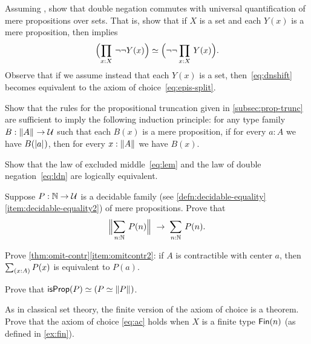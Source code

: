 \begin{ex}\label{ex:lem-impl-dn-commutes}
  Assuming \LEM{}, show that double negation commutes with universal quantification of mere propositions over sets.
  That is, show that if $X$ is a set and each $Y(x)$ is a mere proposition, then \LEM{} implies
  \begin{equation}
    \eqv{\Parens{\prd{x:X} \neg\neg Y(x)}}{\Parens{\neg\neg \prd{x:X} Y(x)}}.\label{eq:dnshift}
  \end{equation}
  Observe that if we assume instead that each $Y(x)$ is a set, then~\eqref{eq:dnshift} becomes equivalent to the axiom of choice~\eqref{eq:epis-split}.
\end{ex}

\begin{ex}\label{ex:prop-trunc-ind}
  Show that the rules for the propositional truncation given in \cref{subsec:prop-trunc} are sufficient to imply the following induction principle: for any type family $B:\mathopen{}\left\Vert A\right\Vert_{}\mathclose{} \to \mathcal{U}$ such that each $B(x)$ is a mere proposition, if for every $a:A$ we have $B(\mathopen{}\left|a\right|_{}^{}\mathclose{})$, then for every $x:\mathopen{}\left\Vert A\right\Vert_{}\mathclose{}$ we have $B(x)$.
\end{ex}

\begin{ex}\label{ex:lem-ldn}
  Show that the law of excluded middle~\eqref{eq:lem} and the law of double negation~\eqref{eq:ldn} are logically equivalent.
\end{ex}

\begin{ex}\label{ex:decidable-choice}
  Suppose $P:\mathbb{N}\to\mathcal{U}$ is a decidable family (see \cref{defn:decidable-equality}\ref{item:decidable-equality2}) of mere propositions.
  Prove that
  \[ \Brck{\sm{n:\nat} P(n)} \;\to\; \sm{n:\nat}P(n).\]
\end{ex}

\begin{ex}\label{ex:omit-contr2}
  Prove \cref{thm:omit-contr}\ref{item:omitcontr2}: if $A$ is contractible with center $a$, then $\sm{x:A} P(x)$ is equivalent to $P(a)$.
\end{ex}

\begin{ex}\label{ex:isprop-equiv-equiv-bracket}
  Prove that $\mathsf{isProp}(P) \simeq (P \simeq \mathopen{}\left\Vert P\right\Vert_{}\mathclose{})$.
\end{ex}

\begin{ex}\label{ex:finite-choice}
  As in classical set theory, the finite version of the axiom of choice is a theorem.  Prove that the axiom of choice \eqref{eq:ac} holds when $X$ is a finite type $\mathsf{Fin}(n)$ (as defined in \cref{ex:fin}).
\end{ex}

